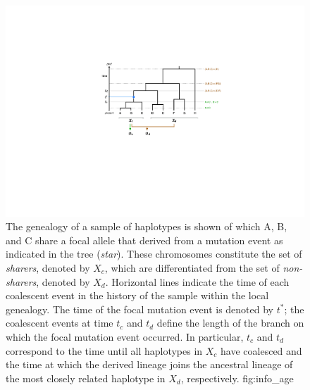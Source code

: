 

\begin{figure}[!htb]
\includegraphics[width=\textwidth]{./img/ch5/info_age}
%
{The genealogy of a sample of  haplotypes is shown of which A, B, and C share a focal allele that derived from a mutation event as indicated in the tree (\emph{star}).
These chromosomes constitute the set of \emph{sharers}, denoted by $X_c$, which are differentiated from the set of \emph{non-sharers}, denoted by $X_d$.
Horizontal lines indicate the time of each coalescent event in the history of the sample within the local genealogy.
The time of the focal mutation event is denoted by ${t^\ast}$; the  coalescent events at time $t_c$ and $t_d$ define the length of the branch on which the focal mutation event occurred.
In particular, $t_c$ and $t_d$ correspond to the time until all haplotypes in $X_c$ have coalesced and the time at which the derived lineage joins the ancestral lineage of the most closely related haplotype in $X_d$, respectively.}%
{fig:info_age}
\end{figure}


